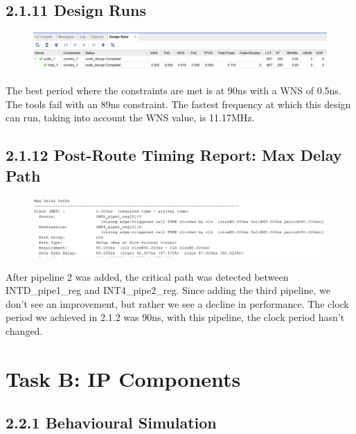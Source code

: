 \documentclass[11pt]{report}
\begin{document}
\section*{2.1.11 Design Runs}
\begin{figure}[H]
    \includegraphics[width=\columnwidth]{Assets/2.1.11_design-runs.png}
\end{figure}
The best period where the constraints are met is at 90ns with a WNS of 0.5ns. The tools fail with an 89ns constraint. The fastest frequency at which this design can run, taking into account the WNS value, is 11.17MHz.

\section*{2.1.12 Post-Route Timing Report: Max Delay Path}
\begin{figure}[H]
    \includegraphics[width=\columnwidth]{Assets/2.1.12_max-path-delays.png}
\end{figure}
After pipeline 2 was added, the critical path was detected between INTD\_pipe1\_reg and INT4\_pipe2\_reg. Since adding the third pipeline, we don't see an improvement, but rather we see a decline in performance. The clock period we achieved in 2.1.2 was 90ns, with this pipeline, the clock period hasn't changed.

\chapter*{Task B: IP Components}

\section*{2.2.1 Behavioural Simulation}
\end{document}
